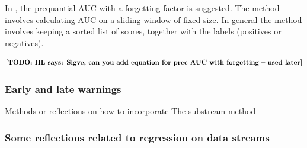 In \cite{Brz14}, the prequantial AUC with a forgetting factor is suggested.  The method involves calculating AUC on a sliding window of fixed size.  In general the method involves keeping a sorted list of scores, together with the labels (positives or negatives).    

\begin{equation}
\label{equ:precAUCforget}
\text{\todo{HL says: Sigve, can you add equation for prec AUC with forgetting -- used later}}
\end{equation}






\subsubsection{Early and late warnings}
Methods or reflections on how to incorporate
The substream method



\subsubsection{Some reflections related to regression on data streams}


%
%
%
%





